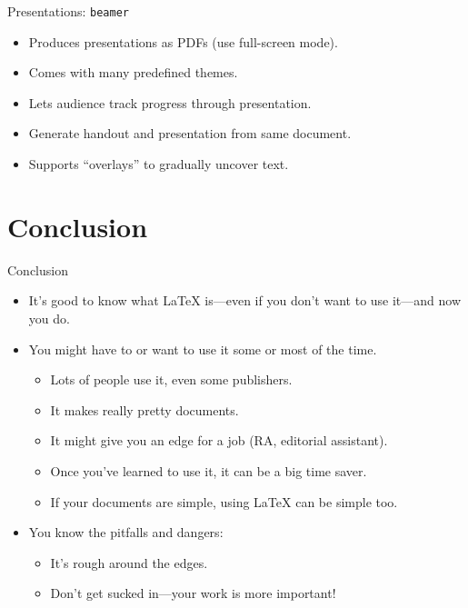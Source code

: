 \begin{frame}{Presentations: \texttt{beamer}}

\begin{itemize}[<+->]
\item Produces presentations as PDFs (use full-screen mode).
\item Comes with many predefined themes.
\item Lets audience track progress through presentation.
\item Generate handout and presentation from same document.
\item Supports ``overlays'' to gradually uncover text.
\end{itemize}

\end{frame}

\section{Conclusion}

\begin{frame}{Conclusion}

\begin{itemize}
\item It's good to know what \LaTeX{} is---even if you don't want to
  use it---and now you do.
\item You might have to or want to use it some or most of the time.
\begin{itemize}
\item Lots of people use it, even some publishers.
\item It makes really pretty documents.
\item It might give you an edge for a job (RA, editorial assistant).
\item Once you've learned to use it, it can be a big time saver.
\item If your documents are simple, using \LaTeX{} can be simple too.
\end{itemize}
\item You know the pitfalls and dangers:
\begin{itemize}
\item It's rough around the edges.
\item Don't get sucked in---your work is more important!
\end{itemize}
\end{itemize}
\end{frame}

